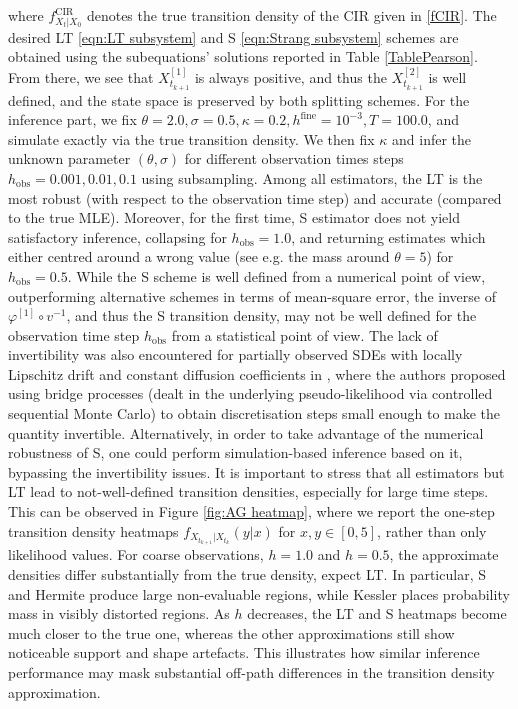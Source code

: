 \documentclass[a4paper,12pt]{article}
\numberwithin{equation}{section}
\theoremstyle{plain}
\theoremstyle{definition}
\begin{document}
where  $f^{\textrm{CIR}}_{X_t|X_0}$ denotes the true transition density of the CIR given in \eqref{fCIR}. The desired LT \eqref{eqn:LT subsystem} and S \eqref{eqn:Strang subsystem} schemes are obtained using the subequations' solutions reported in Table \ref{TablePearson}. From there, we see that $X^{[1]}_{t_{k+1}}$ is always positive, and thus the $X^{[2]}_{t_{k+1}}$ is well defined, and the state space is preserved by both splitting schemes. For the inference part, we fix $\theta=2.0, \sigma=0.5, \kappa=0.2, h^{\textrm{fine}}=10^{-3}, T=100.0$, and simulate exactly via the true transition density. We then fix $\kappa$ and infer the unknown parameter $(\theta,\sigma)$ for different observation times steps $h_{\textrm{obs}}=0.001, 0.01, 0.1$ using subsampling. Among all estimators, the LT is the most robust (with respect to the observation time step) and accurate (compared to the true MLE). Moreover, for the first time, S estimator does not yield satisfactory inference, collapsing for $h_\textrm{obs}=1.0$, and returning estimates which either centred around a wrong value (see e.g. the mass around $\theta=5$) for $h_\textrm{obs}=0.5$. While the S scheme is well defined from a numerical point of view, outperforming alternative schemes in terms of mean-square error, the inverse of $\varphi^{[1]}\circ v^{-1}$, and thus the S transition density, may not be well defined for the observation time step $h_\textrm{obs}$ from a statistical point of view. The lack of invertibility was also encountered for partially observed SDEs with locally Lipschitz drift and constant diffusion coefficients in \cite{Huangetal2025}, where the authors proposed using bridge processes (dealt in the underlying pseudo-likelihood via controlled sequential Monte Carlo) to obtain discretisation steps small enough to make the quantity invertible. Alternatively, in order to take advantage of the numerical robustness of S, one could perform simulation-based inference based on it, bypassing the invertibility issues. It is important to stress that all estimators but LT lead to not-well-defined transition densities, especially for large time steps. This can be observed in Figure \ref{fig:AG heatmap}, where we report the one-step transition density heatmaps $f_{X_{t_{k+1}}|X_{t_k}}(y|x)$ for $x,y\in[0,5]$, rather than only likelihood values. For coarse observations, $h=1.0$ and $h=0.5$, the approximate densities differ substantially from the true density, expect LT. In particular, S and Hermite produce large non-evaluable regions, while Kessler places probability mass in visibly distorted regions. As $h$ decreases, the LT and S heatmaps become much closer to the true one, whereas the other approximations still show noticeable support and shape artefacts. This illustrates how similar inference performance may mask substantial off-path differences in the transition density approximation.
\end{document}
